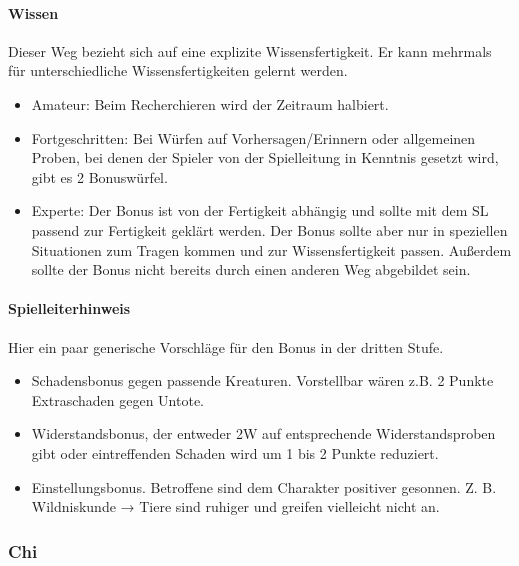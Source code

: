 \documentclass{article}
\begin{document}
\paragraph{Wissen}

Dieser Weg bezieht sich auf eine explizite Wissensfertigkeit. Er kann mehrmals für unterschiedliche
Wissensfertigkeiten gelernt werden.

\begin{itemize}
\item Amateur: Beim Recherchieren wird der Zeitraum halbiert.
\item Fortgeschritten: Bei Würfen auf Vorhersagen/Erinnern oder allgemeinen Proben, bei denen der Spieler von der Spielleitung in Kenntnis gesetzt wird, gibt es 2 Bonuswürfel.
\item Experte: Der Bonus ist von der Fertigkeit abhängig und sollte mit dem SL passend zur Fertigkeit geklärt werden. Der Bonus sollte aber nur in speziellen Situationen zum Tragen kommen und zur Wissensfertigkeit passen. Außerdem sollte der Bonus nicht bereits durch einen anderen Weg abgebildet sein.
\end{itemize}

\begin{mdframed}[hidealllines=true, backgroundcolor=black!10]
\paragraph{Spielleiterhinweis}

Hier ein paar generische Vorschläge für den Bonus in der dritten Stufe.

\begin{itemize}
\item Schadensbonus gegen passende Kreaturen. Vorstellbar wären z.B. 2 Punkte Extraschaden gegen Untote.
\item Widerstandsbonus, der entweder 2W auf entsprechende Widerstandsproben gibt oder eintreffenden Schaden wird um 1 bis 2 Punkte reduziert.
\item Einstellungsbonus. Betroffene sind dem Charakter positiver gesonnen. Z. B. Wildniskunde → Tiere sind ruhiger und greifen vielleicht nicht an.
\end{itemize}



\end{mdframed}
\subsubsection{Chi}
\end{document}
